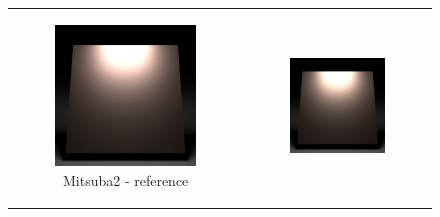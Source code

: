 \renewcommand\thesubfigure{\arabic{subfigure}}
\begin{figure}[h]
	\centering
	\begin{tabular}{cc}
		\begin{subfigure}
			{0.4\textwidth}\centering\includegraphics[width=\linewidth]{img/ggx_copper_60.png}
			\caption{Mitsuba2 - reference}
		\end{subfigure}
		&
		\begin{subfigure}
			{0.4\textwidth}\centering\includegraphics[width=\linewidth]{img/ggx_copper_60_ART.png}

\end{subfigure}
\end{tabular}
\end{figure}
